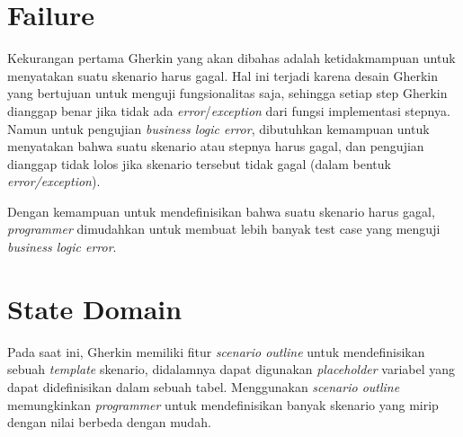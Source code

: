 \section{Failure}

Kekurangan pertama Gherkin yang akan dibahas adalah ketidakmampuan untuk
menyatakan suatu skenario harus gagal.
Hal ini terjadi karena desain Gherkin yang bertujuan untuk menguji fungsionalitas saja,
sehingga setiap step Gherkin dianggap benar jika tidak ada \emph{error}/\emph{exception}
dari fungsi implementasi stepnya.
Namun untuk pengujian \emph{business logic error}, dibutuhkan kemampuan untuk menyatakan
bahwa suatu skenario atau stepnya harus gagal, dan pengujian dianggap tidak lolos
jika skenario tersebut tidak gagal (dalam bentuk \emph{error/exception}).

Dengan kemampuan untuk mendefinisikan bahwa suatu skenario harus gagal,
\emph{programmer} dimudahkan untuk membuat lebih banyak test case
yang menguji \emph{business logic error}.

\section{State Domain}

Pada saat ini, Gherkin memiliki fitur \emph{scenario outline}
untuk mendefinisikan sebuah \emph{template} skenario,
didalamnya dapat digunakan \emph{placeholder} variabel yang dapat didefinisikan
dalam sebuah tabel.
Menggunakan \emph{scenario outline} memungkinkan \emph{programmer} untuk
mendefinisikan banyak skenario yang mirip dengan nilai berbeda dengan mudah.
